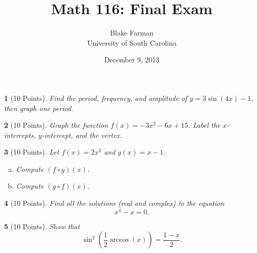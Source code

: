 \documentclass[12pt]{amsart}
\author{Blake Farman\\University of South Carolina}
\title{Math 116: Final Exam}
\date{December 9, 2013}
\begin{document}
\maketitle

\begin{center}
\end{center}

\vspace{0.2in}
\vspace{0.2in}

\theoremstyle{plain}
\newtheorem{thm}{}
\newtheorem{lem}{Lemma}
\theoremstyle{definition}
\newtheorem{defn}{Definition}

\begin{thm}[10 Points]\label{ex1}
  Find the period, frequency, and amplitude of $y = 3\sin(4x) - 1$, then graph one period.
\end{thm}

\newpage

\begin{thm}[10 Points]
	Graph the function $f(x) = -3x^2 - 6x + 15$.
	Label the $x$-intercepts, $y$-intercept, and the vertex.
	\vspace{3.5in}
\end{thm}

\begin{thm}[10 Points]\label{ex3}
  Let $f(x) = 2x^2$ and $g(x) = x-1$.
  \begin{enumerate}[(a)]
  \item
    Compute $(f \circ g)(x)$.
    \vspace{2in}
  \item
    Compute $(g \circ f)(x)$.
    \vspace{2in}
  \end{enumerate}
\end{thm}

\newpage

\begin{thm}[10 Points]
	Find all the solutions (real and complex) to the equation 
	$$x^4 - x = 0.$$
	\vspace{3in}
\end{thm}

\begin{thm}[10 Points]
	Show that $$\sin^2\left(\frac{1}{2}\arccos(x)\right) = \frac{1- x}{2}.$$
\end{thm}
\end{document}
